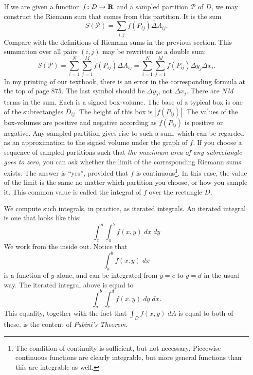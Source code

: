 \documentclass[12pt]{amsart}
\begin{document}
If we are given a function $f \colon D \to \mathbf{R}$ and a sampled partition $\mathcal{P}$ of $D$, we may construct the Riemann sum that comes from this partition. It is the sum
\[
S(\mathcal{P}) = \sum_{i,j} f(P_{ij}) \Delta A_{ij}.
\]
Compare with the definitions of Riemann sums in the previous section. This summation over all pairs $(i,j)$ may be rewritten as a double sum:
\[
S(\mathcal{P}) = \sum_{i=1}^N \sum_{j=1}^M f(P_{ij}) \Delta A_{ij} = \sum_{i=1}^N \sum_{j=1}^M f(P_{ij}) \Delta y_j \Delta x_i.
\]
In my printing of our textbook, there is an error in the corresponding formula at the top of page 875. The last symbol should be $\Delta y_j$, not $\Delta x_j$.
There are $NM$ terms in the sum. Each is a signed box-volume. The base of a typical box is one of the subrectangles $D_{ij}$. The height of this box is $|f(P_{ ij})|$. The values of the box-volumes are positive and negative according as $f(P_{ij})$ is positive or negative. Any sampled partition gives rise to such a sum, which can be regarded as an approximation to the signed volume under the graph of $f$. If you choose a sequence of sampled partitions such that \emph{the maximum area of any subrectangle goes to zero}, you can ask whether the limit of the corresponding Riemann sums exists. The answer is ``yes'', provided that $f$ is continuous\footnote{The condition of continuity is sufficient, but not necessary. Piecewise continuous functions are clearly integrable, but more general functions than this are integrable as well.}. In this case, the value of the limit is the same no matter which partition you choose, or how you sample it. This common value is called the integral of $f$ over the rectangle $D$.

We compute such integrals, in practice, as iterated integrals. An iterated integral is one that looks like this:
\[
\int_c^d \int_a^b f(x,y) \; dx \; dy
\]
We work from the inside out. Notice that
\[
\int_a^b f(x,y) \; dx
\]
is a function of $y$ alone, and can be integrated from $y = c$ to $y = d$ in the usual way. The iterated integral above is equal to
\[
\int_a^b \int_c^d f(x,y) \; dy \; dx.
\]
This equality, together with the fact that $\int_D f(x,y) \; dA$ is equal to both of these, is the content of \emph{Fubini's Theorem}.
\end{document}
